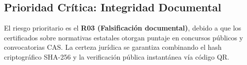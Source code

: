 \subsection{Prioridad Crítica: Integridad Documental}
El riesgo prioritario es el \textbf{R03 (Falsificación documental)}, debido a que los certificados sobre normativas estatales otorgan puntaje en concursos públicos y convocatorias CAS. La certeza jurídica se garantiza combinando el hash criptográfico SHA-256 y la verificación pública instantánea vía código QR.
